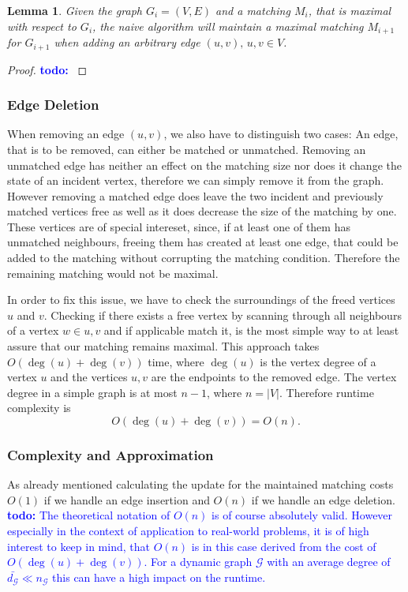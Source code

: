 \documentclass{article}      %
\newcommand\todo[1]{\textcolor{blue}{\textbf{todo: }#1}}
\newtheorem{lemma}{Lemma}[section]
\begin{document}
\begin{lemma}
Given the graph $G_i=(V,E)$ and a matching $M_i$, that is maximal with respect to $G_i$, the naive algorithm will maintain a maximal matching $M_{i+1}$ for $G_{i+1}$ when adding an arbitrary edge $(u,v), \, u,v \in V$.
\end{lemma}

\begin{proof}
\todo{}
\end{proof}

\subsubsection{Edge Deletion}
\label{sec:naive-edge-out}

When removing an edge $(u,v)$, we also have to distinguish two cases: An edge, that is to be removed, can either be matched or unmatched. Removing an unmatched edge has neither an effect on the matching size nor does it change the state of an incident vertex, therefore we can simply remove it from the graph. However removing a matched edge does leave the two incident and previously matched vertices free as well as it does decrease the size of the matching by one. These vertices are of special intereset, since, if at least one of them has unmatched neighbours, freeing them has created at least one edge, that could be added to the matching without corrupting the matching condition. Therefore the remaining matching would not be maximal. 

In order to fix this issue, we have to check the surroundings of the freed vertices $u$ and $v$. Checking if there exists a free vertex by scanning through all neighbours of a vertex $w \in {u,v}$ and if applicable match it, is the most simple way to at least assure that our matching remains maximal. This approach takes $O(\deg(u) + \deg(v))$ time, where $\deg(u)$ is the vertex degree of a vertex $u$ and the vertices $u,v$ are the endpoints to the removed edge. The vertex degree in a simple graph is at most $n-1$, where $n=|V|$. Therefore runtime complexity is 
$$
	O(\deg(u) + \deg(v)) = O(n).
$$

\subsubsection{Complexity and Approximation}
\label{sec:naive-complx-approx}

As already mentioned calculating the update for the maintained matching costs $O(1)$ if we handle an edge insertion and $O(n)$ if we handle an edge deletion. \todo{The theoretical notation of $O(n)$ is of course absolutely valid. However especially in the context of application to real-world problems, it is of high interest to keep in mind, that $O(n)$ is in this case derived from the cost of $O(\deg(u) + \deg(v))$. For a dynamic graph $\mathcal{G}$ with an average degree of $\bar{d_{\mathcal{G}}} \ll n_{\mathcal{G}}$ this can have a high impact on the runtime.}
\end{document}
